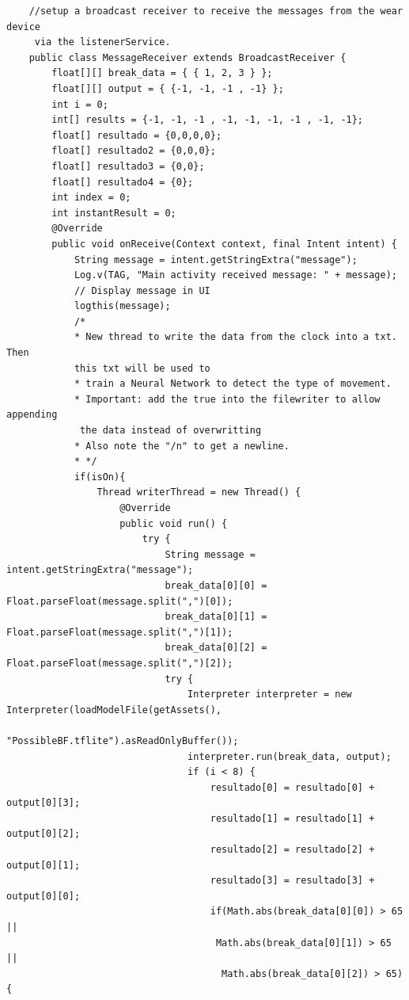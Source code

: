 \documentclass[12pt]{book}
\numberwithin{equation}{section}
\begin{document}
\begin{appendices}
\begin{verbatim}
    //setup a broadcast receiver to receive the messages from the wear device
     via the listenerService.
    public class MessageReceiver extends BroadcastReceiver {
        float[][] break_data = { { 1, 2, 3 } };
        float[][] output = { {-1, -1, -1 , -1} };
        int i = 0;
        int[] results = {-1, -1, -1 , -1, -1, -1, -1 , -1, -1};
        float[] resultado = {0,0,0,0};
        float[] resultado2 = {0,0,0};
        float[] resultado3 = {0,0};
        float[] resultado4 = {0};
        int index = 0;
        int instantResult = 0;
        @Override
        public void onReceive(Context context, final Intent intent) {
            String message = intent.getStringExtra("message");
            Log.v(TAG, "Main activity received message: " + message);
            // Display message in UI
            logthis(message);
            /*
            * New thread to write the data from the clock into a txt. Then 
            this txt will be used to
            * train a Neural Network to detect the type of movement.
            * Important: add the true into the filewriter to allow appending
             the data instead of overwritting
            * Also note the "/n" to get a newline.
            * */
            if(isOn){
                Thread writerThread = new Thread() {
                    @Override
                    public void run() {
                        try {
                            String message = intent.getStringExtra("message");
                            break_data[0][0] = Float.parseFloat(message.split(",")[0]);
                            break_data[0][1] = Float.parseFloat(message.split(",")[1]);
                            break_data[0][2] = Float.parseFloat(message.split(",")[2]);
                            try {
                                Interpreter interpreter = new Interpreter(loadModelFile(getAssets(),
                                 "PossibleBF.tflite").asReadOnlyBuffer());
                                interpreter.run(break_data, output);
                                if (i < 8) {
                                    resultado[0] = resultado[0] + output[0][3];
                                    resultado[1] = resultado[1] + output[0][2];
                                    resultado[2] = resultado[2] + output[0][1];
                                    resultado[3] = resultado[3] + output[0][0];
                                    if(Math.abs(break_data[0][0]) > 65 ||
                                     Math.abs(break_data[0][1]) > 65 ||
                                      Math.abs(break_data[0][2]) > 65) {

\end{verbatim}
\end{appendices}
\end{document}
